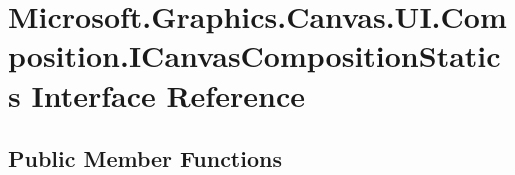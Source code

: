 \hypertarget{interface_microsoft_1_1_graphics_1_1_canvas_1_1_u_i_1_1_composition_1_1_i_canvas_composition_statics}{}\section{Microsoft.\+Graphics.\+Canvas.\+U\+I.\+Composition.\+I\+Canvas\+Composition\+Statics Interface Reference}
\label{interface_microsoft_1_1_graphics_1_1_canvas_1_1_u_i_1_1_composition_1_1_i_canvas_composition_statics}
\subsection*{Public Member Functions}
